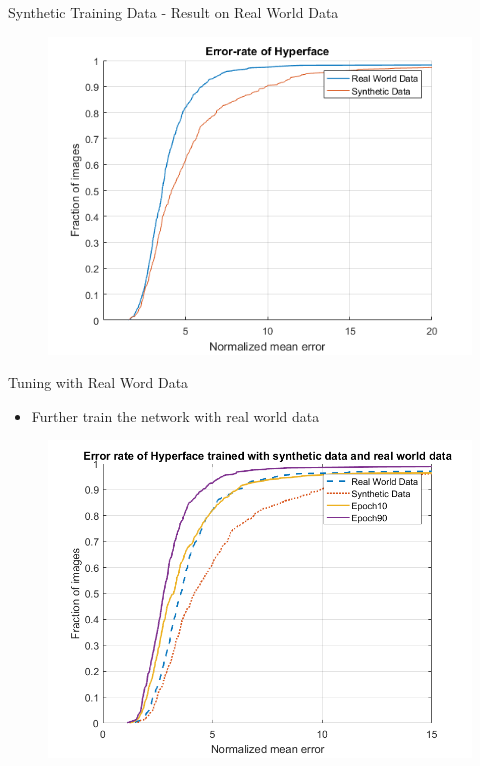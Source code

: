 \documentclass{beamer}
\begin{document}
\begin{frame}{Synthetic Training Data - Result on Real World Data}
\begin{figure}
\centering
\includegraphics[scale=0.6]{fig/error_rate_synth_on_aflw}
\end{figure}
\end{frame}




\begin{frame}{Tuning with Real Word Data}

\begin{itemize}
\item Further train the network with real world data
\end{itemize}
\begin{figure}
\centering
\includegraphics[scale=0.4]{fig/error_rate_synth_real2}
\end{figure}

\end{frame}
\end{document}
